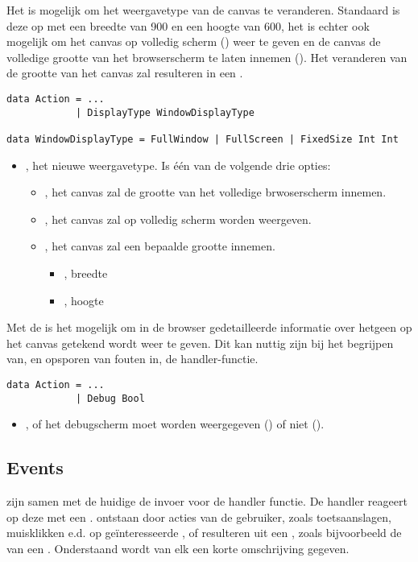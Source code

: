 Het is mogelijk om het weergavetype van de canvas te veranderen. Standaard is deze op  met een breedte van 900 en een hoogte van 600, het is echter ook mogelijk om het canvas op volledig scherm () weer te geven en de canvas de volledige grootte van het browserscherm te laten innemen (). Het veranderen van de grootte van het canvas zal resulteren in een {\color{red} }.
\begin{lstlisting}
data Action = ...
			| DisplayType WindowDisplayType
			
data WindowDisplayType = FullWindow | FullScreen | FixedSize Int Int
\end{lstlisting}
\begin{itemize}
	\item {}, het nieuwe weergavetype. Is één van de volgende drie opties:
		\begin{itemize}
			\item {}, het canvas zal de grootte van het volledige brwoserscherm innemen.
			\item {}, het canvas zal op volledig scherm worden weergeven.
			\item {}, het canvas zal een bepaalde grootte innemen. 
				\begin{itemize}
					\item {}, breedte
					\item {}, hoogte
				\end{itemize}
		\end{itemize}
\end{itemize}

Met de  is het mogelijk om in de browser gedetailleerde informatie over hetgeen op het canvas getekend wordt weer te geven. Dit kan nuttig zijn bij het begrijpen van, en opsporen van fouten in, de handler-functie.
\begin{lstlisting}
data Action = ...
			| Debug Bool
\end{lstlisting}
\begin{itemize}
	\item {}, of het debugscherm moet worden weergegeven () of niet ().
\end{itemize}

\subsection{Events}
\events zijn samen met de huidige  de invoer voor de handler functie. De handler reageert op deze \events met een . \events ontstaan door acties van de gebruiker, zoals toetsaanslagen, muisklikken e.d. op geïnteresseerde \shapes, of resulteren uit een , zoals bijvoorbeeld de  van een .
Onderstaand wordt van elk  een korte omschrijving gegeven.

